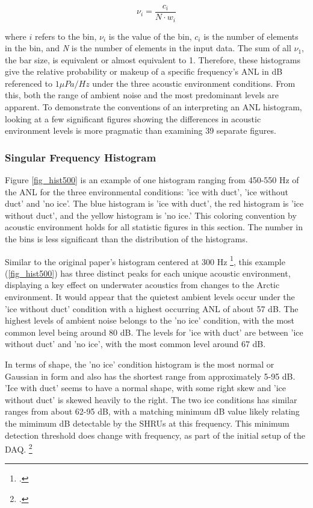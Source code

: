 \begin{equation} \label{eq:hist_pdf}
 \nu _{i}=\frac{c_{i}}{N \cdot w_{i}} 
\end{equation}

where $i$ refers to the bin, $\nu _{i}$ is the value of the bin, $c_{i}$ is the number of elements in the bin, and \textit{N} is the number of elements in the input data. The sum of all $\nu_{1}$, the bar size, is equivalent or almost equivalent to 1. Therefore, these histograms give the relative probability or makeup of a specific frequency's ANL in dB referenced to  $1 \mu Pa/Hz$ under the three acoustic environment conditions. From this, both the range of ambient noise and the most predominant levels are apparent. To demonstrate the conventions of an interpreting an ANL histogram, looking at a few significant figures showing the differences in acoustic environment levels is more pragmatic than examining 39 separate figures.

\subsubsection{Singular Frequency Histogram}
Figure \ref{fig_hist500} is an example of one histogram ranging from 450-550 Hz of the ANL for the three environmental conditions: 'ice with duct',  'ice without duct' and 'no ice'.  The blue histogram is 'ice with duct', the red histogram is 'ice without duct', and the yellow histogram is 'no ice.'  This coloring convention by acoustic environment holds for all statistic figures in this section. The number in the bins is less significant than the distribution of the histograms. 

Similar to the original paper's histogram centered at 300 Hz \footcite[]{Bonnel2021}, this example (\autoref{fig_hist500}) has three distinct peaks for each unique acoustic environment, displaying a key effect on underwater acoustics from changes to the Arctic environment.  It would appear that the quietest ambient levels occur under the 'ice without duct' condition with a highest occurring ANL of about 57 dB. The highest levels of ambient noise belongs to  the 'no ice' condition, with the most common level being around 80 dB. The levels for 'ice with duct' are between 'ice without duct' and 'no ice', with the most common level around 67 dB. 

In terms of shape, the 'no ice' condition histogram is the most normal or Gaussian in form and also has the shortest range from approximately 5-95 dB. 'Ice with duct' seems to have a normal shape, with some right skew and 'ice without duct' is skewed heavily to the right. The two ice conditions has similar ranges from about 62-95 dB, with a matching minimum dB value likely relating the mimimum dB detectable by the SHRUs at this frequency. This minimum detection threshold does change with frequency, as part of the initial setup of the DAQ. \footcite{daq process} %

